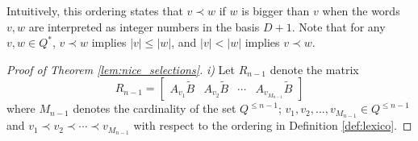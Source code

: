 \documentclass[journal]{IEEEtran}
\begin{document}
Intuitively, this ordering states that $v \prec w$ if $w$ is bigger than $v$ when the words $v,w$ are interpreted as integer numbers in the basis $D+1$. Note that for any $v,w \in Q^{*}$,  $v \prec w$ implies $|v| \le |w|$, and $|v| < |w|$ implies  $v \prec w$.

\begin{proof}[Proof of Theorem \ref{lem:nice_selections}]
\emph{i)} Let $R_{n-1}$ denote the matrix
\[ R_{n-1}= \begin{bmatrix}
A_{v_1}\widetilde{B} & A_{v_2}\widetilde{B} & \cdots & A_{v_{M_{n-1}}}\widetilde{B}
\end{bmatrix} \]
where $M_{n-1}$ denotes the cardinality of the set $Q^{\leq n-1}$; $v_1,v_2, \dots, v_{M_{n-1}} \in Q^{\leq n-1}$ and $v_1 \prec v_2 \prec \cdots \prec v_{M_{n-1}}$ with respect to the ordering in Definition \ref{def:lexico}.


\end{proof}
\end{document}
